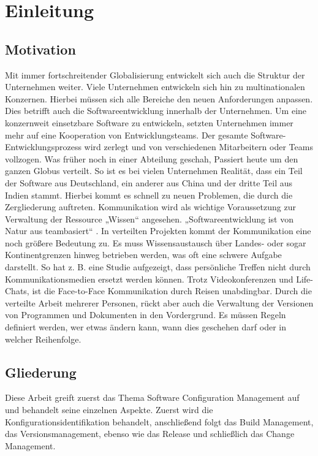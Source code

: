 \chapter {Einleitung}

\section {Motivation}
Mit immer fortschreitender Globalisierung entwickelt sich auch die Struktur der Unternehmen weiter. Viele Unternehmen entwickeln sich hin zu multinationalen Konzernen. Hierbei müssen sich alle Bereiche den neuen Anforderungen anpassen. Dies betrifft auch die Softwareentwicklung innerhalb der Unternehmen. Um eine konzernweit einsetzbare Software zu entwickeln, setzten Unternehmen immer mehr auf eine Kooperation von Entwicklungsteams. Der gesamte Software-Entwicklungsprozess wird zerlegt und von verschiedenen Mitarbeitern oder Teams vollzogen. Was früher noch in einer Abteilung geschah, Passiert heute um den ganzen Globus verteilt. So ist es bei vielen Unternehmen Realität, dass ein Teil der Software aus Deutschland, ein anderer aus China und der dritte Teil aus Indien stammt. Hierbei kommt es schnell zu neuen Problemen, die durch die Zergliederung auftreten. Kommunikation wird als wichtige Voraussetzung zur Verwaltung der Ressource „Wissen“ angesehen. „Softwareentwicklung ist von Natur aus teambasiert“ \cite{einleitung}. In verteilten Projekten kommt der Kommunikation eine noch größere Bedeutung zu. Es muss Wissensaustausch über Landes- oder sogar Kontinentgrenzen hinweg betrieben werden, was oft eine schwere Aufgabe darstellt. So hat \acs{z. B.} eine Studie aufgezeigt, dass persönliche Treffen nicht durch Kommunikationsmedien ersetzt werden können. Trotz Videokonferenzen und  Life-Chats, ist die Face-to-Face Kommunikation durch Reisen unabdingbar. Durch die verteilte Arbeit mehrerer Personen, rückt aber auch die Verwaltung der Versionen von Programmen und Dokumenten in den Vordergrund. Es müssen Regeln definiert werden, wer etwas ändern kann, wann dies geschehen darf oder in welcher Reihenfolge. 
\section{Gliederung}
Diese Arbeit greift zuerst das Thema Software Configuration Management auf und behandelt seine einzelnen Aspekte.
Zuerst wird die Konfigurationsidentifikation behandelt, anschließend folgt das Build Management, das Versionsmanagement, ebenso wie das Release und schließlich das Change Management.
